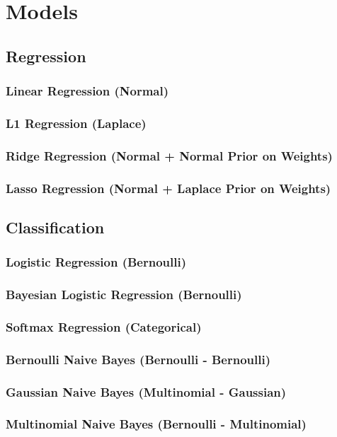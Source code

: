 \section{Models}
\subsection{Regression}
\subsubsection{Linear Regression (Normal)}
\subsubsection{L1 Regression (Laplace)}
\subsubsection{Ridge Regression (Normal + Normal Prior on Weights)}
\subsubsection{Lasso Regression (Normal + Laplace Prior on Weights)}

\subsection{Classification}
\subsubsection{Logistic Regression (Bernoulli)}
\subsubsection{Bayesian Logistic Regression (Bernoulli)}
\subsubsection{Softmax Regression (Categorical)}
\subsubsection{Bernoulli Naive Bayes (Bernoulli - Bernoulli)}
\subsubsection{Gaussian Naive Bayes (Multinomial - Gaussian)}
\subsubsection{Multinomial Naive Bayes (Bernoulli - Multinomial)}
